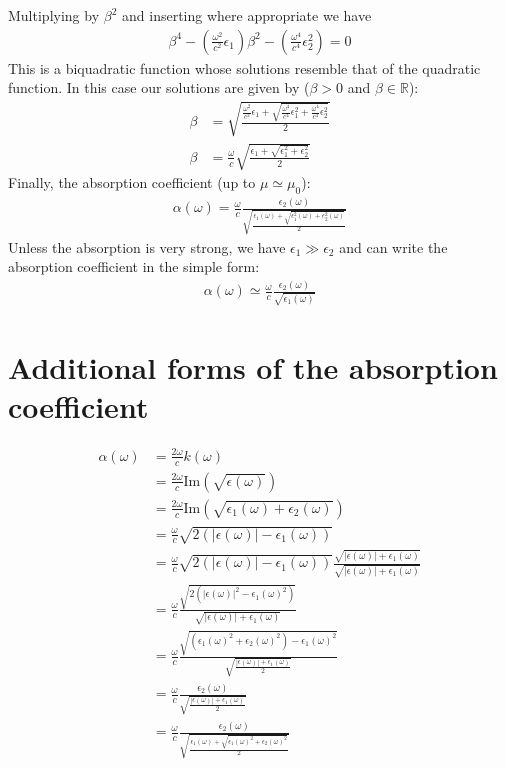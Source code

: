 Multiplying by $\beta^2$ and inserting where appropriate we have
\begin{align}
    \beta^4-\left(\frac{\omega^2}{c^2}\epsilon_1\right)\beta^2-\left(\frac{\omega^4}{c^4}\epsilon_2^2\right)=0
\end{align}
This is a biquadratic function whose solutions resemble that of the quadratic function. In this case our solutions are given by ($\beta>0$ and $\beta\in \mathbb{R}$):
\begin{align}
    \beta &= \sqrt{\frac{\frac{\omega^2}{c^2}\epsilon_1 +\sqrt{\frac{\omega^4}{c^4}\epsilon_1^2+\frac{\omega^4}{c^4}\epsilon_2^2}}{2}} \\
    \beta &= \frac{\omega}{c} \sqrt{\frac{\epsilon_1 +\sqrt{\epsilon_1^2+\epsilon_2^2}}{2}}
\end{align}
Finally, the absorption coefficient (up to $\mu\simeq\mu_0$):
\begin{align}
    \alpha(\omega)=\frac{\omega}{c}\frac{\epsilon_2(\omega)}{\sqrt{\frac{\epsilon_1(\omega) +\sqrt{\epsilon_1^2(\omega)+\epsilon_2^2(\omega)}}{2}}}
\end{align}
Unless the absorption is very strong, we have $\epsilon_1\gg\epsilon_2$ and can write the absorption coefficient in the simple form:
\begin{align}
    \alpha(\omega)\simeq\frac{\omega}{c}\frac{\epsilon_2(\omega)}{\sqrt{\epsilon_1(\omega)}}
\end{align}



\section{Additional forms of the absorption coefficient}

\begin{align}
    \alpha(\omega)
    &= \frac{2\omega}{c} k(\omega) \\
    &= \frac{2\omega}{c} \text{Im}\left(\sqrt{\epsilon(\omega)}\right) \\
    &= \frac{2\omega}{c} \text{Im}\left(\sqrt{\epsilon_1(\omega)+\epsilon_2(\omega)}\right) \\
    &= \frac{\omega}{c} \sqrt{2(|\epsilon(\omega)|-\epsilon_1(\omega))} \\
    &= \frac{\omega}{c} \sqrt{2(|\epsilon(\omega)|-\epsilon_1(\omega))}  \frac{\sqrt{|\epsilon(\omega)|+\epsilon_1(\omega)}}{\sqrt{|\epsilon(\omega)|+\epsilon_1(\omega)}} \\
    &= \frac{\omega}{c} \frac{\sqrt{2(|\epsilon(\omega)|^2-\epsilon_1(\omega)^2)}}{\sqrt{|\epsilon(\omega)|+\epsilon_1(\omega)}} \\
    &= \frac{\omega}{c} \frac{\sqrt{(\epsilon_1(\omega)^2+\epsilon_2(\omega)^2)-\epsilon_1(\omega)^2}}{\sqrt{\frac{|\epsilon(\omega)|+\epsilon_1(\omega)}{2}}} \\
    &= \frac{\omega}{c} \frac{\epsilon_2(\omega)}{\sqrt{\frac{|\epsilon(\omega)|+\epsilon_1(\omega)}{2}}} \\
    &= \frac{\omega}{c} \frac{\epsilon_2(\omega)}{\sqrt{\frac{\epsilon_1(\omega)+\sqrt{\epsilon_1(\omega)^2+\epsilon_2(\omega)^2}}{2}}}
\end{align}
